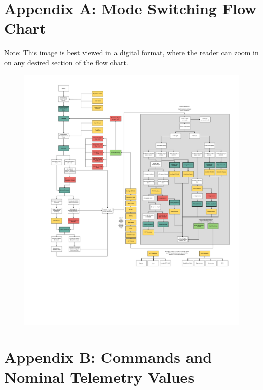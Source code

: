 \documentclass{article}
\begin{document}
\newpage

\section{Appendix A: Mode Switching Flow Chart}

Note: This image is best viewed in a digital format, where the reader can zoom in on any desired section of the flow chart.

\begin{figure}[h!]
\centering
\includegraphics[width=\textwidth,height=.8\textheight]{FlowChart.pdf}
\end{figure} 

\newpage
\section{Appendix B: Commands and Nominal Telemetry Values}
\end{document}
